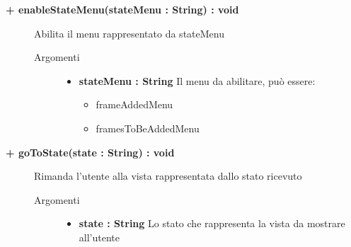 \begin{description}
	\begin{description}
		\item[\textbf{\color{blue}+ enableStateMenu(stateMenu : String) : void			}] \hfill
			Abilita il menu rappresentato da stateMenu
			
		\begin{description}
			\item[Argomenti] \hfill
				\begin{itemize}
				
					\item \textbf{stateMenu : String			} \hfill
					Il menu da abilitare, può essere: 
					\begin{itemize}
						\item frameAddedMenu
						\item framesToBeAddedMenu
					\end{itemize}
					
				\end{itemize}
		\end{description}
	\end{description}
	
	\begin{description}
		\item[\textbf{\color{blue}+ goToState(state : String) : void			}] \hfill
			Rimanda l'utente alla vista rappresentata dallo stato ricevuto
			
		\begin{description}
			\item[Argomenti] \hfill
				\begin{itemize}
				
					\item \textbf{state : String			} \hfill
					Lo stato che rappresenta la vista da mostrare all'utente
					
				\end{itemize}
		\end{description}
	\end{description}
	
			

\end{description}